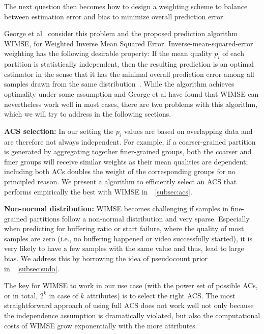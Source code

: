The next question then becomes how to design a weighting scheme to balance between estimation error and bias to minimize overall prediction error. 

George et al~\cite{george2008value} consider this problem and the proposed prediction algorithm WIMSE, for Weighted Inverse Mean Squared Error.  Inverse-mean-squared-error weighting has the following desirable property: If the mean quality $p_i$ of each partition is statistically independent, then the resulting prediction is an optimal estimator in the sense that it has the minimal overall prediction error among all samples drawn from the same distribution~\cite{george2008value}.
While the algorithm achieves optimality under some assumption and George et al have found that WIMSE can nevertheless work well in most cases, there are two problems with this algorithm, which we will try to address in the following sections.
\begin{packeditemize}
	\item {\bf ACS selection:} In our setting the $p_i$ values are based on overlapping data and are therefore not always independent. For example, if a coarser-grained partition is generated by aggregating together finer-grained groups, both the coarser and finer groups will receive similar weights as their mean qualities are dependent; including both ACs doubles the weight of the corresponding groups for no principled reason. We present a algorithm to efficiently select an ACS that performs empirically the best with WIMSE in~\Section~\ref{subsec:acs}.
	\item {\bf Non-normal distribution:}  WIMSE becomes challenging if samples in fine-grained partitions follow a non-normal distribution and very sparse. Especially when predicting for buffering ratio or start failure, where the quality of most samples are zero (i.e., no buffering happened or video successfully started), it is very likely to have a few samples with the same value and thus, lead to large bias.  We address this by borrowing the idea of pseudocount prior in~\Section~\ref{subsec:sudo}.
\end{packeditemize}

\label{subsec:acs}
The key for WIMSE to work in our use case (with the power set of possible ACs, or in total, $2^k$ in case of $k$ attributes) is to select the right ACS.
The most straightforward approach of using full ACS does not work well not only because the independence assumption is dramatically violated, 
but also the computational costs of WIMSE grow exponentially with the more attributes.

